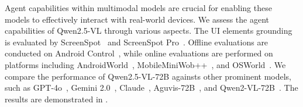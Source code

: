 Agent capabilities within multimodal models are crucial for enabling these models to effectively interact with real-world devices. We assess the agent capabilities of Qwen2.5-VL through various aspects. The UI elements grounding is evaluated by ScreenSpot~\citep{cheng2024seeclick} and ScreenSpot Pro~\citep{screenspotpro}. Offline evaluations are conducted on Android Control~\citep{li2024effects}, while online evaluations are performed on platforms including AndroidWorld~\citep{rawles2024androidworld}, MobileMiniWob++~\citep{rawles2024androidworld}, and OSWorld~\citep{xie2025osworld}. We compare the performance of Qwen2.5-VL-72B againsts other prominent models, such as GPT-4o~\citep{gpt4o}, Gemini 2.0~\citep{gemini2}, Claude~\citep{sonnet3_5_computer_use}, Aguvis-72B~\citep{xu2024aguvis}, and Qwen2-VL-72B~\citep{Qwen2-VL}. The results are demonstrated in .

\begin{table}[h]
\centering
\caption{\textbf{Performance of Qwen2.5-VL and other models on GUI Agent benchmarks.}}
\label{tab:agent_bench}
{}
\end{table}


